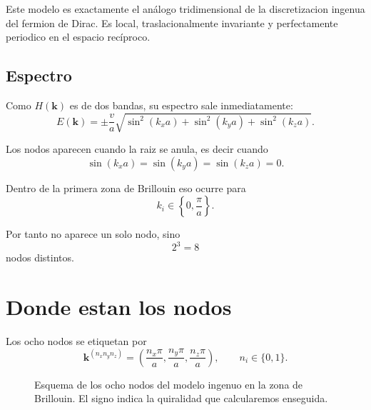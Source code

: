 Este modelo es exactamente el análogo tridimensional de la discretizacion ingenua del fermion de Dirac. Es local, traslacionalmente invariante y perfectamente periodico en el espacio recíproco.

\subsection{Espectro}
Como \(H(\bm{k})\) es de dos bandas, su espectro sale inmediatamente:
\begin{equation}
E(\bm{k})=
\pm \frac{v}{a}
\sqrt{
\sin^2(k_x a)+\sin^2(k_y a)+\sin^2(k_z a)
}.
\label{c27:eq:spec}
\end{equation}

Los nodos aparecen cuando la raiz se anula, es decir cuando
\begin{equation}
\sin(k_x a)=\sin(k_y a)=\sin(k_z a)=0.
\label{c27:eq:zeros}
\end{equation}

Dentro de la primera zona de Brillouin eso ocurre para
\begin{equation}
k_i \in \left\{0,\frac{\pi}{a}\right\}.
\end{equation}

Por tanto no aparece un solo nodo, sino
\begin{equation}
2^3 = 8
\end{equation}
nodos distintos.

\section{Donde estan los nodos}
Los ocho nodos se etiquetan por
\begin{equation}
\bm{k}^{(n_x n_y n_z)}=
\left(
\frac{n_x\pi}{a},
\frac{n_y\pi}{a},
\frac{n_z\pi}{a}
\right),
\qquad
n_i\in\{0,1\}.
\label{c27:eq:nodes}
\end{equation}

\begin{figure}[h!]
\centering
{}
\caption{Esquema de los ocho nodos del modelo ingenuo en la zona de Brillouin. El signo indica la quiralidad que calcularemos enseguida.}
\end{figure}

